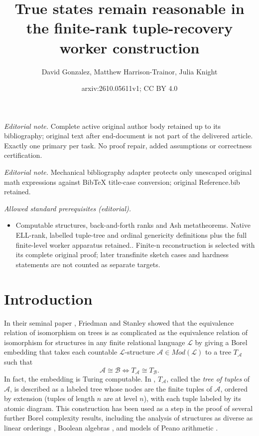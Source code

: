 \documentclass[10pt,a4paper]{article}
\title{True states remain reasonable in the finite-rank tuple-recovery worker construction}
\author{David Gonzalez, Matthew Harrison-Trainor, Julia Knight}
\date{arxiv:2610.05611v1; CC BY 4.0}
\theoremstyle{definition}
\begin{document}
\maketitle
\noindent\textit{Editorial note.} Complete active original author body retained up to its bibliography; original text after end-document is not part of the delivered article. Exactly one primary per task. No proof repair, added assumptions or correctness certification.\par\medskip
\noindent\textit{Editorial note.} Mechanical bibliography adapter protects only unescaped original math expressions against BibTeX title-case conversion; original Reference.bib retained.\par\medskip
\noindent\textit{Allowed standard prerequisites (editorial).}\begin{itemize}
\item Computable structures, back-and-forth ranks and Ash metatheorems. Native ELL-rank, labelled tuple-tree and ordinal genericity definitions plus the full finite-level worker apparatus retained.. Finite-n reconstruction is selected with its complete original proof; later transfinite sketch cases and hardness statements are not counted as separate targets.
\end{itemize}\medskip
	\section{Introduction}
	
	In their seminal paper \cite{FriedmanStanley}, Friedman and Stanley showed that the equivalence relation of isomorphism on trees is as complicated as the equivalence relation of isomorphism for structures in any finite relational language $\mathcal{L}$ by giving a Borel embedding that takes each countable $\mathcal{L}$-structure $\mathcal{A} \in Mod(\mathcal{L})$ to a tree $T_{\mathcal{A}}$ such that
	\[ \mathcal{A} \cong \mathcal{B} \Longleftrightarrow T_{\mathcal{A}} \cong T_{\mathcal{B}}.\] In fact, the embedding is Turing computable. 
	In \cite{HTMontalban}, $T_{\mathcal{A}}$, called the \textit{tree of tuples} of $\mathcal{A}$, is described as a labeled tree whose nodes are the finite tuples of $\mathcal{A}$, ordered by extension (tuples of length $n$ are at level $n$), with each tuple labeled by its atomic diagram. This construction has been used as a step in the proof of several further Borel complexity results, including the analysis of structures as diverse as linear orderings \cite{FriedmanStanley}, Boolean algebras \cite{CamerloGao}, and models of Peano arithmetic \cite{MR,GLRS}. 
	
\end{document}
